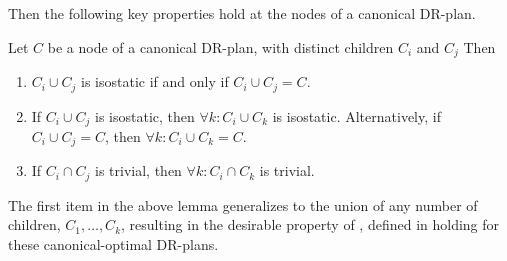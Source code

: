 Then the following key properties hold at the nodes of a canonical DR-plan.

\begin{lemma*}\label{lemma:combined_lemma}
Let $C$ be a node of a canonical DR-plan, with distinct children $C_i$ and $C_j$
Then
\begin{enumerate}
    \item\label{lemma:wc_intersection_is_C}
    $C_i\cup C_j$ is isostatic if and only if $C_i\cup C_j = C$.

    \item\label{lemma:wc_intersection_makes_all_wc}
    If $C_i\cup C_j$ is isostatic, then $\forall k: C_i\cup C_k$ is isostatic. Alternatively, if $C_i\cup C_j=C$, then $\forall k: C_i\cup C_k=C$.

    \item\label{lemma:uc_intersection_makes_all_uc}
    If $C_i\cap C_j$ is trivial, then $\forall k: C_i\cap C_k$ is trivial.
\end{enumerate}
\end{lemma*}

\begin{remark}
The first item in the above lemma generalizes to the union of any number of children, $C_1,\ldots,C_k$, resulting in the desirable property of , defined in \cite{hoffman2001decompositionI} holding for these canonical-optimal DR-plans.
\end{remark}






%     
%     



